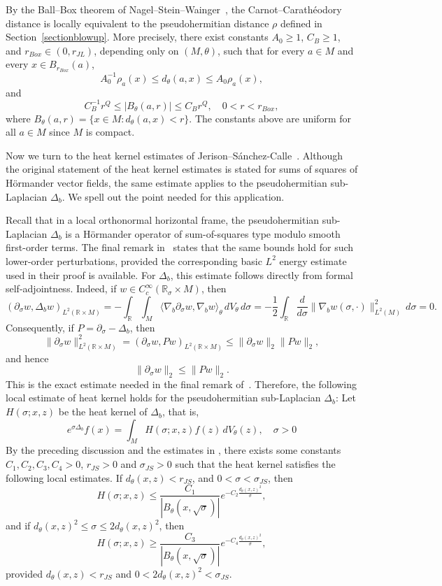 \documentclass[11pt]{article}
\numberwithin{equation}{section}
\newcommand{\R}{\mathbb{R}}
\numberwithin{equation}{section}
\begin{document}
	By the Ball--Box theorem of Nagel--Stein--Wainger~\cite{NSW1985}, the Carnot--Carath\'eodory distance is locally equivalent to the pseudohermitian distance \(\rho\) defined in Section~\ref{sectionblowup}. More precisely, there exist constants \(A_0\ge1\), \(C_B\ge1\), and \(r_{Box}\in(0,r_{JL})\), depending only on \((M,\theta)\), such that for every \(a\in M\) and every \(x\in B_{r_{Box}}(a)\),
	\begin{equation}\label{equbox}
		A_0^{-1}\rho_a(x)\le d_\theta(a, x)\le A_0\rho_a(x),
	\end{equation}
	and
	\[
	C_B^{-1} r^Q\le |B_\theta (a, r)| \le C_B r^Q, \quad 0 < r < r_{Box},
	\]
	where \(B_\theta(a,r) = \{x \in M: d_\theta(a,x) < r\}\). The constants above are uniform for all \(a\in M\) since \(M\) is compact.
	
	Now we turn to the heat kernel estimates of Jerison--S\'anchez-Calle~\cite{JS1986}. Although the original statement of the heat kernel estimates is stated for sums of squares of H\"ormander vector fields, the same estimate applies to the pseudohermitian sub-Laplacian \(\Delta_b\). We spell out the point needed for this application.
	
	Recall that in a local orthonormal horizontal frame, the pseudohermitian sub-Laplacian \(\Delta_b\) is a H\"ormander operator of sum-of-squares type modulo smooth first-order terms.  The final remark in~\cite{JS1986} states that the same bounds hold for such lower-order perturbations, provided the corresponding basic \(L^2\) energy estimate used in their proof is available. For \(\Delta_b\), this estimate follows directly from formal self-adjointness. Indeed, if \(w\in C_c^\infty(\R_\sigma\times M)\), then
	\[
	(\partial_\sigma w, \Delta_b w)_{L^2(\mathbb{R} \times M)}  =-\int_{\mathbb{R}} \int_M\langle\nabla_b \partial_\sigma w, \nabla_b w\rangle_\theta\,d V_\theta\,d \sigma =-\frac{1}{2} \int_{\mathbb{R}} \frac{d}{d \sigma}\|\nabla_b w(\sigma, \cdot)\|_{L^2(M)}^2\,d \sigma=0.
	\]
	Consequently, if \(P=\partial_\sigma-\Delta_b\), then
	\[
	\|\partial_\sigma w\|_{L^2(\mathbb{R} \times M)}^2=(\partial_\sigma w, P w)_{L^2(\mathbb{R} \times M)} \leq\|\partial_\sigma w\|_2\|P w\|_2,
	\]
	and hence
	\[
	\|\partial_\sigma w\|_2 \leq\|P w\|_2 .
	\]
	This is the exact estimate needed in the final remark of~\cite{JS1986}. Therefore, the following  local estimate of heat kernel holds for the pseudohermitian sub-Laplacian \(\Delta_b\): Let \(H(\sigma ; x, z)\) be the heat kernel of \(\Delta_b\), that is,
	\[
	e^{\sigma \Delta_b} f(x)=\int_M H(\sigma ; x, z) f(z)\,d V_\theta(z), \quad \sigma>0
	\]
	By the preceding discussion and the estimates in \cite{JS1986}, there exists some constants \(C_1, C_2, C_3, C_4>0\), \(r_{JS}>0\) and \(\sigma_{JS}>0\) such that the heat kernel satisfies the following local estimates. If \(d_\theta(x, z) < r_{JS}\), and \(0<\sigma<\sigma_{JS}\), then
	\[
	H(\sigma ; x, z) \leq \frac{C_1}{|B_\theta(x, \sqrt{\sigma})|} e^{-C_2 \frac{d_\theta(x, z)^2}{\sigma}},
	\]
	and if \(d_\theta(x, z)^2 \leq \sigma \leq 2d_\theta(x, z)^2\), then
	\[
	H(\sigma ; x, z) \geq \frac{C_3}{|B_\theta(x, \sqrt{\sigma})|} e^{-C_4 \frac{d_\theta(x, z)^2}{\sigma}},
	\]
	provided \(d_\theta(x, z) < r_{JS}\) and \(0<2d_\theta(x, z)^2 <\sigma_{JS}\).
	
\end{document}
